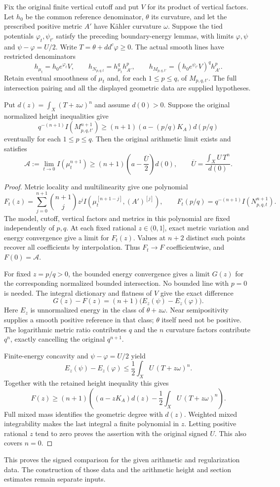 Fix the original finite vertical cutoff and put $V$ for its product
of vertical factors. Let $h_0$ be the common reference denominator,
$\theta$ its curvature, and let the prescribed positive metric
$A'$ have Kähler curvature $\omega$. Suppose the tied potentials
$\varphi_t,\psi_{t'}$ satisfy the preceding boundary-energy lemmas,
with limits $\varphi,\psi$ and
$\psi-\varphi=U/2$. Write $T=\theta+dd^c\varphi\geq0$.
The actual smooth lines have restricted denominators
\[
 h_{\mu_t}=h_0e^{\varphi_t}V,\qquad
 h_{N_{p,q,t}}=h_{\mu_t}^{q}h_{A'}^p,\qquad
 h_{M_{p,q,t'}}=(h_0e^{\psi_{t'}}V)^qh_{A'}^p.
\]
Retain eventual smoothness of $\mu_t$ and, for each
$1\leq p\leq q$, of $M_{p,q,t'}$. The full intersection pairing
and all the displayed geometric data are supplied hypotheses.

\begin{proposition}
\label{prop:compact-model-signed-stokes}
Put $d(z)=\int_X(T+z\omega)^n$ and assume $d(0)>0$.
Suppose the original normalized height inequalities give
\[
 q^{-(n+1)}I(M_{p,q,t'}^{n+1})
       \geq(n+1)(a-(p/q)K_A)d(p/q)
\]
eventually for each $1\leq p\leq q$.
Then the original arithmetic limit exists and satisfies
\[
 \mathcal A:=\lim_{t\to0}I(\mu_t^{n+1})
 \geq(n+1)\left(a-\frac{\overline U}{2}\right)d(0),
 \qquad \overline U=\frac{\int_XU\,T^n}{d(0)}.
\]
\end{proposition}

\begin{proof}
Metric locality and multilinearity give one polynomial
\[
 F_t(z)=\sum_{j=0}^{n+1}\binom{n+1}{j}z^j
          I(\mu_t^{[n+1-j]},(A')^{[j]}),
 \qquad F_t(p/q)=q^{-(n+1)}I(N_{p,q,t}^{n+1}).
\]
The model, cutoff, vertical factors and metrics in this polynomial
are fixed independently of $p,q$. At each fixed rational
$z\in(0,1]$, exact metric variation and energy convergence give
a limit for $F_t(z)$. Values at $n+2$ distinct such points recover
all coefficients by interpolation. Thus $F_t\to F$ coefficientwise,
and $F(0)=\mathcal A$.

For fixed $z=p/q>0$, the bounded energy convergence gives a limit
$G(z)$ for the corresponding normalized bounded intersection.
No bounded line with $p=0$ is needed. The integral dictionary and
flatness of $V$ give the exact difference
\[
 G(z)-F(z)=(n+1)\bigl(E_z(\psi)-E_z(\varphi)\bigr).
\]
Here $E_z$ is unnormalized energy in the class of $\theta+z\omega$.
Near semipositivity supplies a smooth positive reference in that
class; $\theta$ itself need not be positive. The logarithmic metric
ratio contributes $q$ and the $n$ curvature factors contribute $q^n$,
exactly cancelling the original $q^{n+1}$.

Finite-energy concavity and $\psi-\varphi=U/2$ yield
\[
 E_z(\psi)-E_z(\varphi)
       \leq\frac12\int_XU\,(T+z\omega)^n.
\]
Together with the retained height inequality this gives
\[
 F(z)\geq(n+1)\left((a-zK_A)d(z)
                    -\frac12\int_XU\,(T+z\omega)^n\right).
\]
Full mixed mass identifies the geometric degree with $d(z)$.
Weighted mixed integrability makes the last integral a finite
polynomial in $z$. Letting positive rational $z$ tend to zero proves
the assertion with the original signed $U$. This also covers $n=0$.
\end{proof}

This proves the signed comparison for the given arithmetic and
regularization data. The construction of those data and the
arithmetic height and section estimates remain separate inputs.

